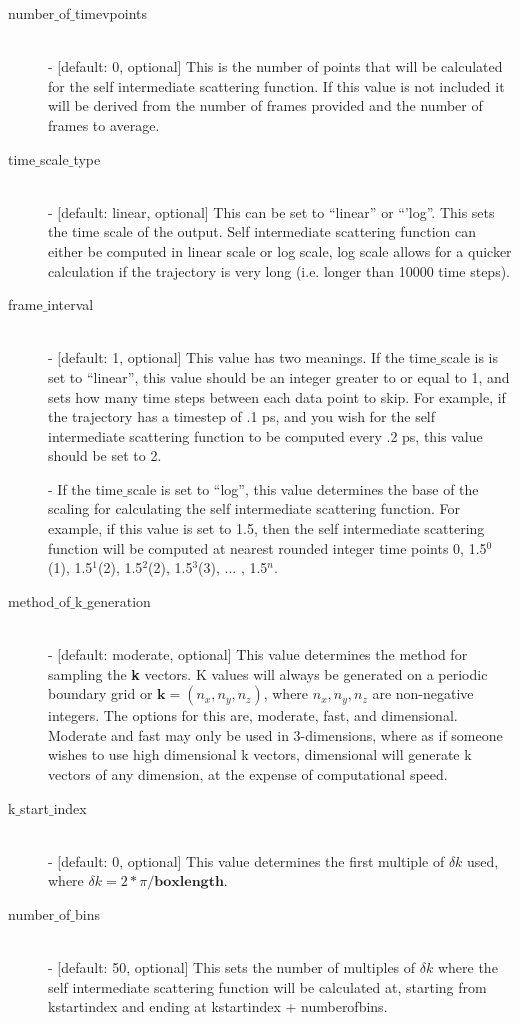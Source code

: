 \documentclass{article}
\begin{document}
\begin{description}	
	\item[number$\_$of$\_$timevpoints]\hfill \\
	- [default: 0, optional] This is the number of points that will be calculated for the self intermediate scattering function.  If this value is not included it will be derived from the number of frames provided and the number of frames to average.
	
	\item[time$\_$scale$\_$type] \hfill \\
	- [default: linear, optional] This can be set to ``linear'' or ``'log''.  This sets the time scale of the output. Self intermediate scattering function can either be computed in linear scale or log scale, log scale allows for a quicker calculation if the trajectory is very long (i.e. longer than 10000 time steps).
	
	\item[frame$\_$interval] \hfill \\
	- [default: 1, optional] This value has two meanings.  If the time$\_$scale is is set to ``linear'', this value should be an integer greater to or equal to 1, and sets how many time steps between each data point to skip.  For example, if the trajectory has a timestep of .1 ps, and you wish for the self intermediate scattering function to be computed every .2 ps, this value should be set to 2. 
	
	- If the time$\_$scale is set to ``log'', this value determines the base of the scaling for calculating the self intermediate scattering function.  For example, if this value is set to 1.5, then the self intermediate scattering function will be computed at nearest rounded integer time points 0, 1.5$^0$(1), 1.5$^1$(2), 1.5$^2$(2), 1.5$^3$(3), ... , 1.5$^{n}$.
	
	\item[method$\_$of$\_$k$\_$generation] \hfill \\
	- [default: moderate, optional] This value determines the method for sampling the \textbf{k} vectors.  K values will always be generated on a periodic boundary grid or $\mathbf{k} = (n_x,n_y,n_z)$, where $n_x, n_y, n_z$ are non-negative integers.  The options for this are, moderate, fast, and dimensional.  Moderate and fast may only be used in 3-dimensions, where as if someone wishes to use high dimensional k vectors, dimensional will generate k vectors of any dimension, at the expense of computational speed.
	
	\item[k$\_$start$\_$index] \hfill \\
	- [default: 0, optional] This value determines the first multiple of $\delta k$ used, where $\delta k = 2*\pi/\textbf{boxlength}$.  
	
	\item[number$\_$of$\_$bins] \hfill \\
	- [default: 50, optional] This sets the number of multiples of $\delta k$ where the self intermediate scattering function will be calculated at, starting from kstartindex and ending at kstartindex + numberofbins. 	
	
\end{description}
\end{document}
